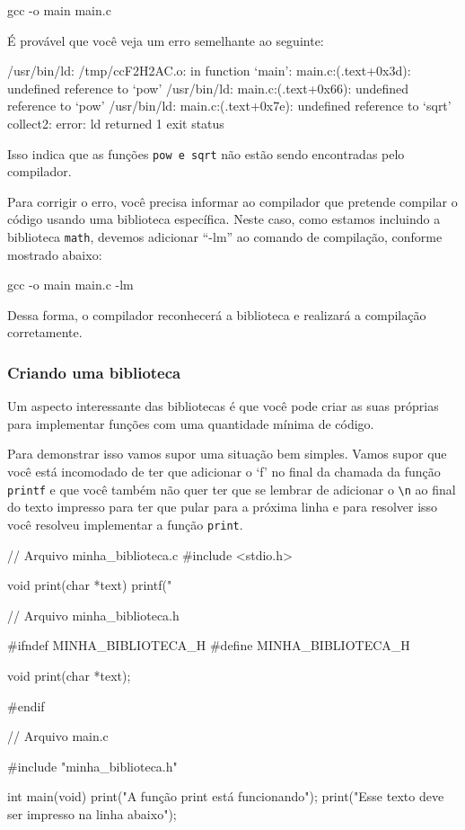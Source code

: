 \begin{textbox}
    gcc -o main main.c
\end{textbox}

É provável que você veja um erro semelhante ao seguinte:

\begin{textbox}
    /usr/bin/ld: /tmp/ccF2H2AC.o: in function `main':
    main.c:(.text+0x3d): undefined reference to `pow'
    /usr/bin/ld: main.c:(.text+0x66): undefined reference to `pow'
    /usr/bin/ld: main.c:(.text+0x7e): undefined reference to `sqrt'
    collect2: error: ld returned 1 exit status
\end{textbox}

Isso indica que as funções \texttt{pow e sqrt} não estão sendo encontradas 
pelo compilador.

Para corrigir o erro, você precisa informar ao compilador que pretende 
compilar o código usando uma biblioteca específica. Neste caso, como estamos 
incluindo a biblioteca \texttt{math}, devemos adicionar ``-lm'' ao comando de compilação, conforme mostrado abaixo:

\begin{textbox}
    gcc -o main main.c -lm
\end{textbox}

Dessa forma, o compilador reconhecerá a biblioteca e realizará a compilação 
corretamente.

\subsubsection{Criando uma biblioteca}

Um aspecto interessante das bibliotecas é que você pode criar as suas 
próprias para implementar funções com uma quantidade mínima de código.

Para demonstrar isso vamos supor uma situação bem simples. Vamos supor que 
você está incomodado de ter que adicionar o `f' no final da chamada da função 
\texttt{printf} e que você também não quer ter que se lembrar de adicionar o 
\texttt{\textbackslash n} ao final do texto impresso para ter que pular para a próxima 
linha e para resolver isso você resolveu implementar a função \texttt{print}.

\begin{excode}
    // Arquivo minha_biblioteca.c
    #include <stdio.h>

    void print(char *text)
    {
        printf("%
    }

    // Arquivo minha_biblioteca.h

    #ifndef MINHA_BIBLIOTECA_H
    #define MINHA_BIBLIOTECA_H

    void print(char *text);

    #endif

    // Arquivo main.c    

    #include "minha_biblioteca.h"

    int main(void)
    {
        print("A função print está funcionando");
        print("Esse texto deve ser impresso na linha abaixo");
    }
\end{excode}

